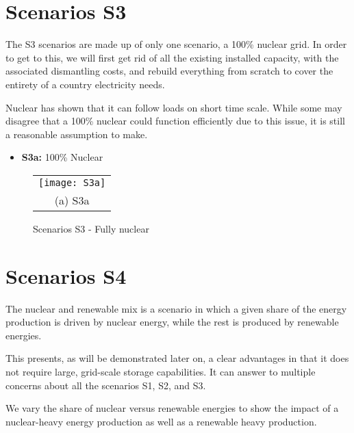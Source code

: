 \section{Scenarios S3}

The S3 scenarios are made up of only one scenario, a 100\% nuclear grid. In order to get to this, we will first get rid of all the existing installed capacity, with the associated dismantling costs, and rebuild everything from scratch to cover the entirety of a country electricity needs.

Nuclear has shown that it can follow loads on short time scale. While some may disagree that a 100\% nuclear could function efficiently due to this issue, it is still a reasonable assumption to make.


\begin{kaobox}[frametitle=S3 scenarios]
\begin{itemize}
	\item \textbf{S3a:} 100\% Nuclear
\end{itemize}
\end{kaobox}


\begin{figure*}
\begin{tabular}{cc}
  \multicolumn{2}{c}{\texttt{[image: S3a]} }\\
\multicolumn{2}{c}{(a) S3a}
\end{tabular}
\caption{Scenarios S3 - Fully nuclear}
\end{figure*}


\section{Scenarios S4}

The nuclear and renewable mix is a scenario in which a given share of the energy production is driven by nuclear energy, while the rest is produced by renewable energies.

This presents, as will be demonstrated later on, a clear advantages in that it does not require large, grid-scale storage capabilities. It can answer to multiple concerns about all the scenarios S1, S2, and S3.

We vary the share of nuclear versus renewable energies to show the impact of a nuclear-heavy energy production as well as a renewable heavy production.


